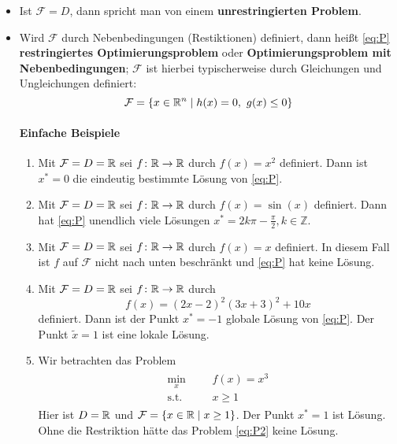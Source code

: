 \begin{itemize}
\item  Ist $\mathcal{F}=D$, dann spricht man von einem \textbf{unrestringierten Problem}.
\item Wird $\mathcal{F}$ durch Nebenbedingungen (Restiktionen) definiert, dann hei\ss t \eqref{eq:P} \textbf{restringiertes Optimierungsproblem} oder \textbf{Optimierungsproblem mit Nebenbedingungen}; $\mathcal{F}$ ist hierbei typischerweise durch Gleichungen und Ungleichungen definiert:
\begin{equation*}
	\mathcal{F}=\{x\in\mathbb R^n \mid h(x)=0,~ g(x)\leq 0\}
\end{equation*}

\paragraph{Einfache Beispiele}


\begin{enumerate}[label=\emph{\alph*})]
\item Mit $\mathcal{F}=D=\mathbb R$ sei $f\colon \mathbb R\to\mathbb R$ durch $f(x)=x^2$ definiert. Dann ist $x^\ast = 0$ die eindeutig bestimmte L\"osung von \eqref{eq:P}.
\item Mit $\mathcal{F}=D=\mathbb R$ sei $f\colon \mathbb R\to\mathbb R$ durch $f(x)=\sin(x)$ definiert. Dann hat \eqref{eq:P} unendlich viele L\"osungen $x^\ast=2k \pi-\frac{\pi}{2} ,k\in \mathbb{Z}$.
\item Mit $\mathcal{F}=D=\mathbb R$ sei $f\colon \mathbb R\to\mathbb R$ durch $f(x)=x$ definiert. In diesem Fall ist $f$ auf $\mathcal{F}$ nicht nach unten beschr\"ankt und \eqref{eq:P} hat keine L\"osung.
\item Mit $\mathcal{F}=D=\mathbb R$ sei $f\colon \mathbb R\to\mathbb R$ durch
\begin{equation*}
	f(x)= (2x-2)^2(3x+3)^2+10x
\end{equation*}
definiert. Dann ist der Punkt $x^\ast = -1$ globale L\"osung von \eqref{eq:P}. Der Punkt $\tilde{x}=1$ ist eine lokale L\"osung.
\item Wir betrachten das Problem
	\begin{gather}
	\label{eq:P2}   
	\tag{P2}
	\begin{aligned}
	\min_x
	& & & f(x) = x^3\\
	\text{s.t.}
	& & & x\geq 1
	\end{aligned}
	\end{gather}
Hier ist $D=\mathbb R$ und $\mathcal{F}=\{x\in\mathbb R \mid x\geq1 \}$. Der Punkt $x^\ast = 1$ ist L\"osung. Ohne die Restriktion h\"atte das Problem \eqref{eq:P2} keine L\"osung.
\end{enumerate}
\end{itemize}

